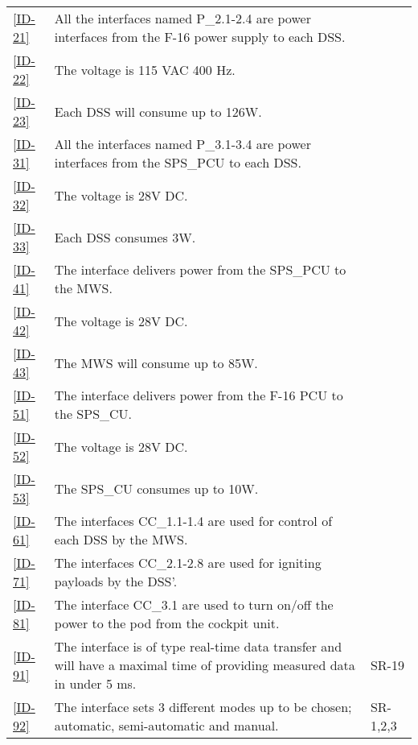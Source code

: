\documentclass[Main]{subfiles}
\begin{document}
\begin{longtable}{l p{10.4cm} p{1.8cm} }
\ref{ID-21} & All the interfaces named P\_2.1-2.4 are power interfaces from the F-16 power supply to each DSS. & \\

\ref{ID-22} & The voltage is 115 VAC 400 Hz. & \\

\ref{ID-23} & Each DSS will consume up to 126W. & \\

\ref{ID-31} & All the interfaces named P\_3.1-3.4 are power interfaces from the SPS\_PCU to each DSS. & \\

\ref{ID-32} & The voltage is 28V DC. & \\

\ref{ID-33} & Each DSS consumes 3W. & \\

\ref{ID-41} & The interface delivers power from the SPS\_PCU to the MWS. & \\

\ref{ID-42} & The voltage is 28V DC. & \\

\ref{ID-43} & The MWS will consume up to 85W. & \\

\ref{ID-51} & The interface delivers power from the F-16 PCU to the SPS\_CU. & \\

\ref{ID-52} & The voltage is 28V DC. & \\

\ref{ID-53} & The SPS\_CU consumes up to 10W. & \\

\ref{ID-61} & The interfaces CC\_1.1-1.4 are used for control of each DSS by the MWS. & \\

\ref{ID-71} & The interfaces CC\_2.1-2.8 are used for igniting payloads by the DSS'. & \\

\ref{ID-81} & The interface CC\_3.1 are used to turn on/off the power to the pod from the cockpit unit. & \\

\ref{ID-91} &The interface is of type real-time data transfer and will have a maximal time of providing measured data in under 5 ms. & SR-19 \\

\ref{ID-92} & The interface sets 3 different modes up to be chosen; automatic, semi-automatic and manual. & SR-1,2,3\\


\end{longtable}
\end{document}
